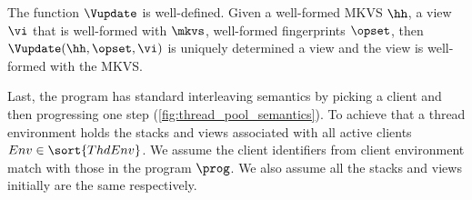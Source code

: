 \begin{lemma}
The function $\Vupdate$ is well-defined.
Given a well-formed MKVS $\hh$, a view $\vi$ that is well-formed with \( \mkvs \), well-formed fingerprints \( \opset \), then $\Vupdate(\hh, \opset, \vi)$ is uniquely determined a view and the view is well-formed with the MKVS.
\end{lemma}

                                                                                                         
Last, the program has standard interleaving semantics by picking a client and then progressing one step (\cref{fig:thread_pool_semantics}).
To achieve that a thread environment holds the stacks and views associated with all active clients \( Env \in \sort{ThdEnv} \).
We assume the client identifiers from client environment match with those in the program \( \prog \).
We also assume all the stacks and views initially are the same respectively.
